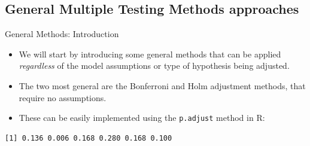 \subsection{General Multiple Testing Methods approaches}

\begin{frame}[fragile]{General Methods: Introduction}
  \begin{itemize}
    \item We will start by introducing some general methods that can be applied \emph{regardless} of the model assumptions or type of hypothesis being adjusted.
    \item The two most general are the \alert{Bonferroni} and \alert{Holm} adjustment methods, that require no assumptions.
    \item These can be easily implemented using the \texttt{p.adjust} method in R:
  \end{itemize}
  
\begin{knitrout}\small
{}\color{fgcolor}\begin{kframe}
\begin{alltt}
\hldef{(}
  \hldef{(}\hldef{,} \hldef{,} \hldef{,} \hldef{,} \hldef{,} \hldef{),}
   \hldef{=} 
\hldef{)}
\end{alltt}
\begin{verbatim}
[1] 0.136 0.006 0.168 0.280 0.168 0.100
\end{verbatim}
\end{kframe}
\end{knitrout}
  
\end{frame}

